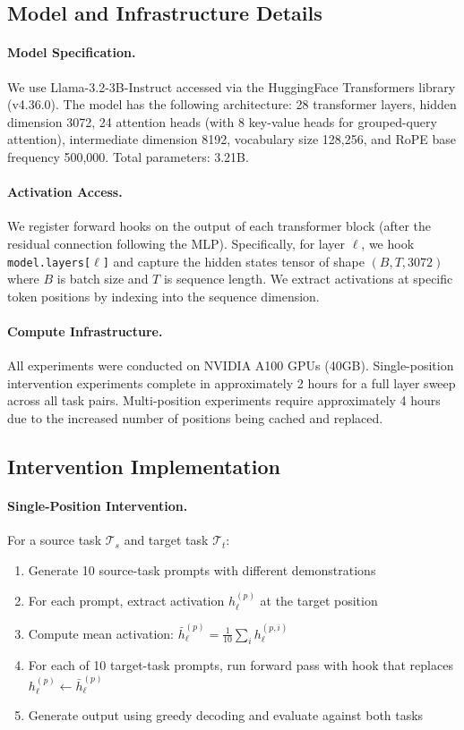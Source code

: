 \documentclass[11pt]{article}
\begin{document}
\subsection{Model and Infrastructure Details}

\paragraph{Model Specification.} We use Llama-3.2-3B-Instruct accessed via the HuggingFace Transformers library (v4.36.0). The model has the following architecture: 28 transformer layers, hidden dimension 3072, 24 attention heads (with 8 key-value heads for grouped-query attention), intermediate dimension 8192, vocabulary size 128,256, and RoPE base frequency 500,000. Total parameters: 3.21B.

\paragraph{Activation Access.} We register forward hooks on the output of each transformer block (after the residual connection following the MLP). Specifically, for layer $\ell$, we hook \texttt{model.layers[$\ell$]} and capture the hidden states tensor of shape $(B, T, 3072)$ where $B$ is batch size and $T$ is sequence length. We extract activations at specific token positions by indexing into the sequence dimension.

\paragraph{Compute Infrastructure.} All experiments were conducted on NVIDIA A100 GPUs (40GB). Single-position intervention experiments complete in approximately 2 hours for a full layer sweep across all task pairs. Multi-position experiments require approximately 4 hours due to the increased number of positions being cached and replaced.

\subsection{Intervention Implementation}

\paragraph{Single-Position Intervention.} For a source task $\mathcal{T}_s$ and target task $\mathcal{T}_t$:
\begin{enumerate}
    \item Generate 10 source-task prompts with different demonstrations
    \item For each prompt, extract activation $h_\ell^{(p)}$ at the target position
    \item Compute mean activation: $\bar{h}_\ell^{(p)} = \frac{1}{10}\sum_i h_\ell^{(p,i)}$
    \item For each of 10 target-task prompts, run forward pass with hook that replaces $h_\ell^{(p)} \leftarrow \bar{h}_\ell^{(p)}$
    \item Generate output using greedy decoding and evaluate against both tasks
\end{enumerate}
\end{document}
